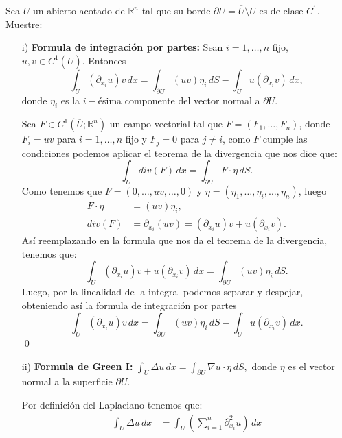 \documentclass{article}
\begin{document}
\maketitle
\thispagestyle{empty}
\newpage 
\begin{homeworkProblem}[1] 

    Sea $U$ un abierto acotado de $\mathbb{R}^n$ tal que su borde $\partial U=\overline{U}\setminus U$ es de clase $C^1.$ Muestre:
    \begin{itemize}
        \item [i)] \textbf{Formula de integración por partes:} Sean $i=1,\dots,n$ fijo, $u,v\in C^1(\overline{U}).$ Entonces
        $$\int_U(\partial_{x_i}u)v\,dx=\int_{\partial U}(uv)\eta_i\,dS-\int_Uu(\partial_{x_i}v)\,dx,$$
        donde $\eta_i$ es la $i-$ésima componente del vector normal a $\partial U.$
        \begin{solucion}
            Sea $F\in C^1(\overline{U};\mathbb{R}^n)$ un campo vectorial tal que $F=(F_1,\dots,F_n)$, donde $F_i=uv$ para $i=1,\dots,n$ fijo y $F_j=0$ para $j\neq i$, como $F$ cumple las condiciones podemos aplicar el teorema de la divergencia que nos dice que:
            $$\int_Udiv(F)\,dx=\int_{\partial U}F\cdot\eta\,dS.$$ 
            Como tenemos que $F=(0,\dots,uv,\dots,0)$ y $\eta=(\eta_1,\dots,\eta_i,\dots,\eta_n)$, luego
            \begin{align*}
                F\cdot\eta&=(uv)\eta_i,\\
                div(F)&=\partial_{x_i}(uv)=(\partial_{x_i}u)v+u(\partial_{x_i}v).
            \end{align*}
            Así reemplazando en la formula que nos da el teorema de la divergencia, tenemos que:
            $$\int_U(\partial_{x_i}u)v+u(\partial_{x_i}v)\,dx=\int_{\partial U}(uv)\eta_i\,dS.$$
            Luego, por la linealidad de la integral podemos separar y despejar, obteniendo así la formula de integración por partes
            $$\int_U(\partial_{x_i}u)v\,dx=\int_{\partial U}(uv)\eta_i\,dS-\int_Uu(\partial_{x_i}v)\,dx.$$
            \qed
        \end{solucion}
        \item [ii)]\textbf{Formula de Green I:} $\int_U\Delta u\,dx=\int_{\partial U}\nabla u\cdot\eta\,dS,$ donde $\eta$ es el vector normal a la superficie $\partial U.$
        \begin{solucion}
            Por definición del Laplaciano tenemos que:
            \begin{align*}
                \int_U\Delta u\,dx&=\int_U\left(\sum_{i=1}^n\partial^2_{x_i}u\right)\,dx\\

\end{align*}
\end{solucion}
\end{itemize}
\end{homeworkProblem}
\end{document}
